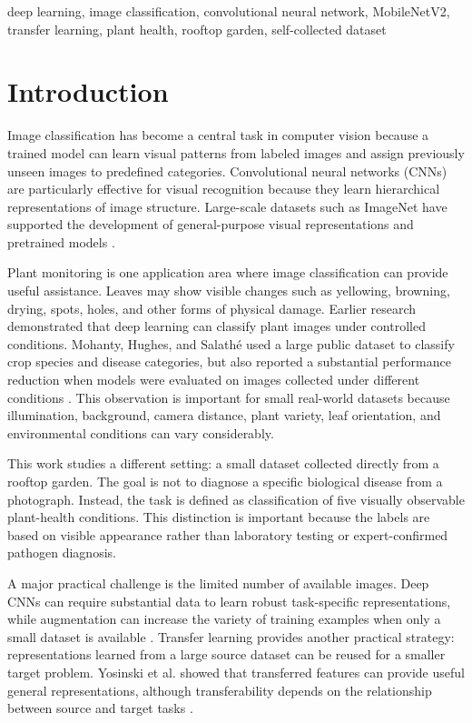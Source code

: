 \documentclass[conference]{IEEEtran}
\begin{document}
\begin{IEEEkeywords}
deep learning, image classification, convolutional neural network, MobileNetV2, transfer learning, plant health, rooftop garden, self-collected dataset
\end{IEEEkeywords}

\section{Introduction}
Image classification has become a central task in computer vision because a trained model can learn visual patterns from labeled images and assign previously unseen images to predefined categories. Convolutional neural networks (CNNs) are particularly effective for visual recognition because they learn hierarchical representations of image structure. Large-scale datasets such as ImageNet have supported the development of general-purpose visual representations and pretrained models \cite{deng2009imagenet}.

Plant monitoring is one application area where image classification can provide useful assistance. Leaves may show visible changes such as yellowing, browning, drying, spots, holes, and other forms of physical damage. Earlier research demonstrated that deep learning can classify plant images under controlled conditions. Mohanty, Hughes, and Salath\'e used a large public dataset to classify crop species and disease categories, but also reported a substantial performance reduction when models were evaluated on images collected under different conditions \cite{mohanty2016}. This observation is important for small real-world datasets because illumination, background, camera distance, plant variety, leaf orientation, and environmental conditions can vary considerably.

This work studies a different setting: a small dataset collected directly from a rooftop garden. The goal is not to diagnose a specific biological disease from a photograph. Instead, the task is defined as classification of five visually observable plant-health conditions. This distinction is important because the labels are based on visible appearance rather than laboratory testing or expert-confirmed pathogen diagnosis.

A major practical challenge is the limited number of available images. Deep CNNs can require substantial data to learn robust task-specific representations, while augmentation can increase the variety of training examples when only a small dataset is available \cite{shorten2019}. Transfer learning provides another practical strategy: representations learned from a large source dataset can be reused for a smaller target problem. Yosinski et al. showed that transferred features can provide useful general representations, although transferability depends on the relationship between source and target tasks \cite{yosinski2014}.
\end{document}
